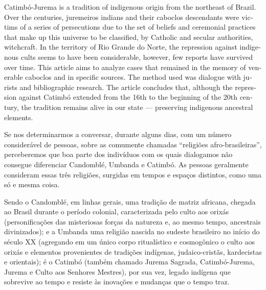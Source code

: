 \begin{refsection}
\begin{otherlanguage}{english}
    \begin{galoResumo}[Abstract]
        Catimbó-Jurema is a tradition of indigenous origin from the northeast of Brazil. Over the centuries, juremeiros indians and their caboclos descendants were victims of a series of persecutions due to the set of beliefs and ceremonial practices that make up this universe to be classified, by Catholic and secular authorities, witchcraft. In the territory of Rio Grande do Norte, the repression against indigenous cults seems to have been considerable, however, few reports have survived over time. This article aims to analyze cases that remained in the memory of venerable caboclos and in specific sources. The method used was dialogue with jurists and bibliographic research. The article concludes that, although the repression against Catimbó extended from the 16th to the beginning of the 20th century, the tradition remains alive in our state --- preserving indigenous ancestral elements.
    \end{galoResumo}
    
    \end{otherlanguage}

    Se nos determinarmos a conversar, durante alguns dias, com um número considerável de pessoas, sobre as comumente chamadas ``religiões afro-brasi\-leiras'', perceberemos que boa parte dos indivíduos com os quais dialogamos não consegue diferenciar Candomblé, Umbanda e Catimbó. As pessoas geralmente consideram essas três religiões, surgidas em tempos e espaços distintos, como uma só e mesma coisa. 

    Sendo o Candomblé, em linhas gerais, uma tradição de matriz africana, chegada ao Brasil durante o período colonial, caracterizada pelo culto aos orixás (personificações das misteriosas forças da natureza e, ao mesmo tempo, ancestrais divinizados); e a Umbanda uma religião nascida no sudeste brasileiro no início do século XX (agregando em um único corpo ritualístico e cosmogônico o culto aos orixás e elementos provenientes de tradições indígenas, judaico-cristãs, kardecistas e orientais); é o Catimbó (também chamado Jurema Sagrada, Catimbó-Jurema, Jurema e Culto aos Senhores Mestres), por sua vez, legado indígena que sobrevive ao tempo e resiste às inovações e mudanças que o tempo traz. 


\end{refsection}
